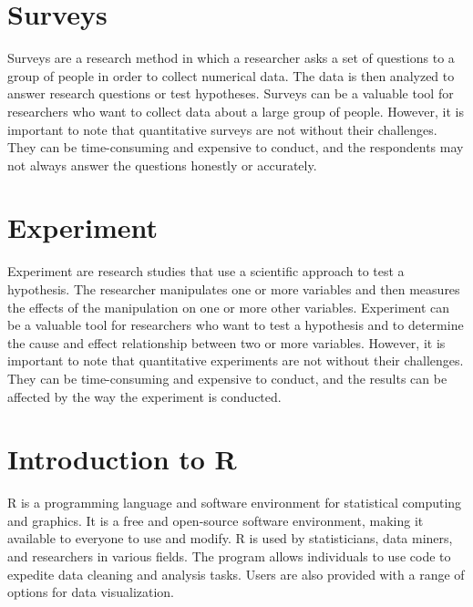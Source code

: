 \documentclass[
  b5paper]{book}
\begin{document}
\hypertarget{surveys}{%
\section*{Surveys}\label{surveys}}

Surveys are a research method in which a researcher asks a set of questions to a group of people in order to collect numerical data. The data is then analyzed to answer research questions or test hypotheses. Surveys can be a valuable tool for researchers who want to collect data about a large group of people. However, it is important to note that quantitative surveys are not without their challenges. They can be time-consuming and expensive to conduct, and the respondents may not always answer the questions honestly or accurately.

\hypertarget{experiment}{%
\section*{Experiment}\label{experiment}}

Experiment are research studies that use a scientific approach to test a hypothesis. The researcher manipulates one or more variables and then measures the effects of the manipulation on one or more other variables. Experiment can be a valuable tool for researchers who want to test a hypothesis and to determine the cause and effect relationship between two or more variables. However, it is important to note that quantitative experiments are not without their challenges. They can be time-consuming and expensive to conduct, and the results can be affected by the way the experiment is conducted.

\hypertarget{introduction-to-r}{%
\section*{Introduction to R}\label{introduction-to-r}}

R is a programming language and software environment for statistical computing and graphics. It is a free and open-source software environment, making it available to everyone to use and modify. R is used by statisticians, data miners, and researchers in various fields. The program allows individuals to use code to expedite data cleaning and analysis tasks. Users are also provided with a range of options for data visualization.
\end{document}
